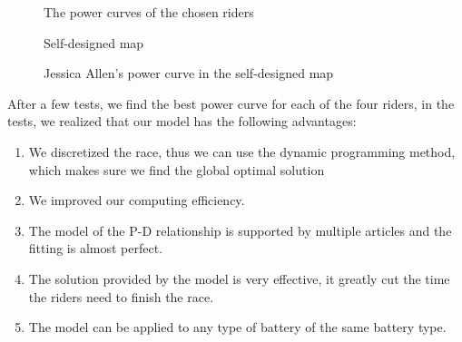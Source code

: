 \documentclass[12pt]{article}
\begin{document}
\begin{figure}[H]
    \centering

    \caption {The power curves of the chosen riders}
\end{figure}

\begin{figure}[H]
    \centering
    \caption{Self-designed map}
\end{figure}
\begin{figure}
    \centering
    
    \caption{Jessica Allen's power curve in the self-designed map}
\end{figure}
After a few tests, we find the best power curve for each of the four riders, in the tests, we realized that
our model has the following advantages:
\begin{enumerate}
    \item We discretized the race, thus we can use the dynamic programming method, which makes sure we find the global optimal solution %
    \item We improved our computing efficiency.%
    \item The model of the P-D relationship is supported by multiple articles and the fitting is almost perfect.
    \item The solution provided by the model is very effective, it greatly cut the time the riders need to finish the race.
    \item The model can be applied to any type of battery of the same battery type.
\end{enumerate}
\end{document}
